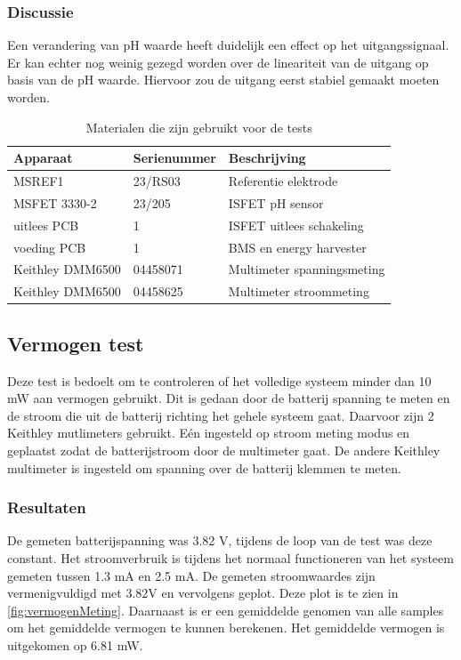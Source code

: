 \subsubsection{Discussie}
Een verandering van pH waarde heeft duidelijk een effect op het uitgangssignaal. Er kan echter nog weinig gezegd worden over de lineariteit van de uitgang op basis van de pH waarde. Hiervoor zou de uitgang eerst stabiel gemaakt moeten worden.


\begin{table}[!htbp]
    \centering
    \begin{tabular}{l|l|l}
        Apparaat         & Serienummer & Beschrijving \\
        \hline
        MSREF1           & 23/RS03     & Referentie elektrode       \\
        MSFET 3330-2     & 23/205      & ISFET pH sensor            \\
        uitlees PCB      & 1           & ISFET uitlees schakeling   \\
        voeding PCB      & 1           & BMS en energy harvester    \\
        Keithley DMM6500 & 04458071    & Multimeter spanningsmeting \\
        Keithley DMM6500 & 04458625    & Multimeter stroommeting    \\
        \hline
    \end{tabular}
    \caption{Materialen die zijn gebruikt voor de tests}
    \label{tab:testMaterialen2}
\end{table}


\subsection{Vermogen test}
Deze test is bedoelt om te controleren of het volledige systeem minder dan 10 mW aan vermogen gebruikt. Dit is gedaan door de batterij spanning te meten en de stroom die uit de batterij richting het gehele systeem gaat. Daarvoor zijn 2 Keithley mutlimeters gebruikt. Eén ingesteld op stroom meting modus en geplaatst zodat de batterijstroom door de multimeter gaat. De andere Keithley multimeter is ingesteld om spanning over de batterij klemmen te meten.

\subsubsection{Resultaten}
De gemeten batterijspanning was 3.82 V, tijdens de loop van de test was deze constant. Het stroomverbruik is tijdens het normaal functioneren van het systeem gemeten tussen 1.3 mA en 2.5 mA. De gemeten stroomwaardes zijn vermenigvuldigd met 3.82V en vervolgens geplot. Deze plot is te zien in \cref{fig:vermogenMeting}. Daarnaast is er een gemiddelde genomen van alle samples om het gemiddelde vermogen te kunnen berekenen. Het gemiddelde vermogen is uitgekomen op 6.81 mW.

